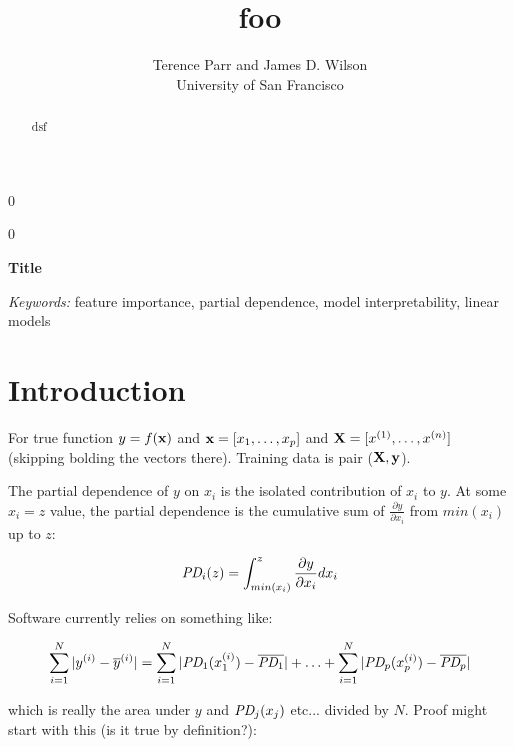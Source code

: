 \documentclass[12pt]{article}
\newcommand{\blind}{0}
\begin{document}
\def\spacingset#1{\renewcommand{\baselinestretch}%
{#1}\small\normalsize} \spacingset{1}



\blind
{
  \title{\bf foo}

  \author{Terence Parr and James D. Wilson\\
      University of San Francisco\\
}
  \maketitle
} \fi

\blind
{
  \bigskip
  \bigskip
  \bigskip
  \begin{center}
    {\LARGE\bf Title}
\end{center}
  \medskip
} \fi

\bigskip
\begin{abstract}
dsf
\end{abstract}

\noindent%
{\it Keywords:} feature importance, partial dependence, model interpretability, linear models

\section{Introduction}
\label{sec:intro}

For true function $y = f(\bf x)$ and ${\bf x} = [x_1, \ldots, x_p]$ and ${\bf X} = [x^{(1)}, \ldots, x^{(n)}]$ (skipping bolding the vectors there).  Training data is pair ($\bf X, y$).

The partial dependence of $y$ on  $x_i$ is the isolated contribution of $x_i$ to $y$. At some $x_i=z$ value, the partial dependence is the cumulative sum of $\frac{\partial y}{\partial x_i}$ from $min(x_i)$ up to $z$:

\[
\text{\it PD}_i(z) = \int_{min(x_i)}^z \frac{\partial y}{\partial x_i} dx_i
\]

Software currently relies on something like:

\[
\sum_{i=1}^{N} |y^{(i)}-\overline{y}^{(i)}| = \sum_{i=1}^{N} |\text{\it PD}_1(x_1^{(i)})-\overline{\text{\it PD}_1}| + \ldots + \sum_{i=1}^{N} |\text{\it PD}_p(x_p^{(i)})-\overline{\text{\it PD}_p}|
\]

\noindent which is really the area under $y$ and $\text{\it PD}_j(x_j)$ etc... divided by $N$.   Proof might start with this (is it true by definition?):
\end{document}

